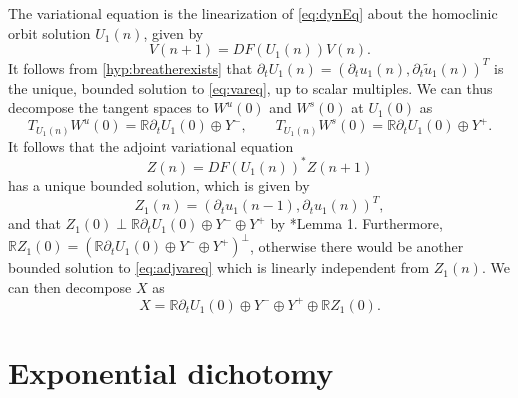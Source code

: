 \documentclass[12pt,reqno]{amsart}
\def\R{{\mathbb R}}
\begin{document}
The variational equation is the linearization of \cref{eq:dynEq} about the homoclinic orbit solution $U_1(n)$, given by
\begin{equation}\label{eq:vareq}
V(n+1) = DF(U_1(n)) V(n).
\end{equation}
It follows from \cref{hyp:breatherexists} that $\partial_t U_1(n) = (\partial_t u_1(n),\partial_t \tilde{u}_1(n))^T$ is the unique, bounded solution to \cref{eq:vareq}, up to scalar multiples. We can thus decompose the tangent spaces to $W^u(0)$ and $W^s(0)$ at $U_1(0)$ as
\begin{equation}\label{eq:TWdecomp}
T_{U_1(n)}W^u(0) = \R \partial_t U_1(0) \oplus Y^-, \qquad  
T_{U_1(n)}W^s(0) = \R \partial_t U_1(0) \oplus Y^+.
\end{equation}
It follows that the adjoint variational equation
\begin{equation}\label{eq:adjvareq}
Z(n) = DF(U_1(n))^* Z(n+1)
\end{equation}
has a unique bounded solution, which is given by
\begin{equation}\label{eq:Z1}
Z_1(n) = (\partial_t u_1(n-1),\partial_t u_1(n))^T,
\end{equation}
and that $Z_1(0) \perp \R \partial_t U_1(0) \oplus Y^- \oplus Y^+$ by \cite{Parker2020}*{Lemma 1}. Furthermore, $\R Z_1(0) = (\R \partial_t U_1(0) \oplus Y^- \oplus Y^+)^\perp$, otherwise there would be another bounded solution to \cref{eq:adjvareq} which is linearly independent from $Z_1(n)$. We can then decompose $X$ as
\begin{equation}\label{eq:Xdecomp}
X = \R \partial_t U_1(0) \oplus Y^- \oplus Y^+ \oplus \R Z_1(0).
\end{equation}

\section{Exponential dichotomy}
\end{document}

